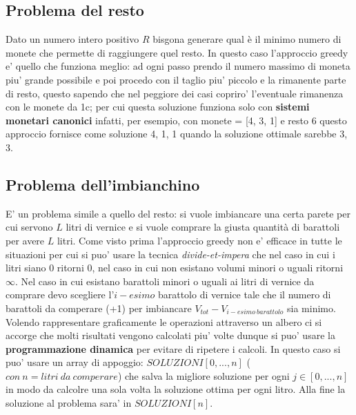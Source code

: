 \documentclass{article}
\begin{document}
\subsection{Problema del resto}
Dato un numero intero positivo $R$ bisgona generare qual è il minimo numero di monete che permette di raggiungere quel resto.
In questo caso l'approccio greedy e' quello che funziona meglio: ad ogni passo prendo il numero massimo di moneta piu' grande possibile e poi procedo con il taglio piu' piccolo e la rimanente parte di resto, questo sapendo che nel peggiore dei casi copriro' l'eventuale rimanenza con le monete da 1c; per cui questa soluzione funziona solo con \textbf{sistemi monetari canonici} infatti, per esempio, con monete = [4, 3, 1] e resto 6 questo approccio fornisce come soluzione {4, 1, 1} quando la soluzione ottimale sarebbe {3, 3}.



\subsection{Problema dell'imbianchino}
E' un problema simile a quello del resto: si vuole imbiancare una certa parete per cui servono $L$ litri di vernice e si vuole comprare la giusta quantità di barattoli per avere $L$ litri.
Come visto prima l'approccio greedy non e' efficace in tutte le situazioni per cui si puo' usare la tecnica \textit{divide-et-impera} che nel caso in cui i litri siano 0 ritorni 0, nel caso in cui non esistano volumi minori o uguali ritorni $\infty$.
Nel caso in cui esistano barattoli minori o uguali ai litri di vernice da comprare devo scegliere l'$i-esimo$ barattolo di vernice tale che il numero di barattoli da comperare (+1) per 
imbiancare $V_{tot}-V_{i-esimo\ barattolo}$ sia minimo.
Volendo rappresentare graficamente le operazioni attraverso un albero ci si accorge che molti risultati vengono calcolati piu' volte dunque si puo' usare la \textbf{programmazione dinamica}
per evitare di ripetere i calcoli. In questo caso si puo' usare un array di appoggio: $SOLUZIONI[0, ..., n]$ ($con\ n = litri\ da\ comperare$) che salva la migliore soluzione per ogni $j \in [0,...,n]$ in modo da calcolre una sola volta
la soluzione ottima per ogni litro. Alla fine la soluzione al problema sara' in $SOLUZIONI[n]$.
\end{document}
